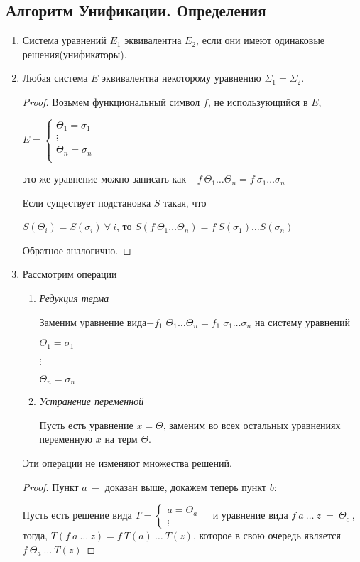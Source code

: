 		\subsection{Алгоритм Унификации. Определения}
		\begin{enumerate}
			\item Система уравнений $E_1$ эквивалентна $E_2$, если они имеют одинаковые решения(унификаторы).
			\item Любая система $E$ эквивалентна некоторому уравнению $\Sigma_1=\Sigma_2$.

	\begin{proof}
		Возьмем функциональный символ $f$, не использующийся в $E$, \par
		$
		E=\begin{cases}
			\Theta_1=\sigma_1&\\
			\vdots&\\
			\Theta_n=\sigma_n&\\
		\end{cases}
		$\par
		это же уравнение можно записать как$-$ $f\:\Theta_1\hdots\Theta_n=f\:\sigma_1 \hdots\sigma_n$\par
		Если существует подстановка $S$ такая, что\par $S(\Theta_i)=S(\sigma_i)\:\forall\:i$,
		то $S(f\:\Theta_1\hdots\Theta_n)=f\:S(\sigma_1)\hdots S(\sigma_n)$ \par Обратное аналогично.\end{proof}
		\item Рассмотрим операции
		\begin{enumerate}
			\item \textit{Редукция терма} \par
					Заменим уравнение вида$-f_1\;\Theta_1 \hdots\Theta_n=f_1\;\sigma_1\hdots\sigma_n$ на систему уравнений\par$\Theta_1=\sigma_1$\par$\vdots$\par$\Theta_n=\sigma_n$
			\item \textit{Устранение переменной} \par
			Пусть есть уравнение $x=\Theta$, заменим во всех остальных уравнениях переменную $x$ на терм $\Theta$.
		\end{enumerate}
		\begin{statement} Эти операции не изменяют множества решений.
		\end{statement}
		\begin{proof} Пункт $a\:-$ доказан выше, докажем теперь пункт $b:$\par Пусть есть решение вида $T = \begin{cases} a = \Theta_a &\\ \vdots \end{cases}$
		и уравнение вида $f\:a\:\hdots\:z\:=\:\Theta_c\:$, тогда, $T(f\:a\:\hdots\:z) = f\:T(a)\:\hdots\:T(z)$, которое в свою очередь является $f\: \Theta_a\:\hdots\:T(z)$
		\end{proof}
	\end{enumerate}	
